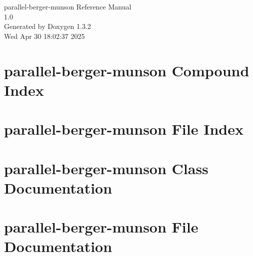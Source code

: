 \documentclass[a4paper]{book}
\begin{document}
\begin{titlepage}
\vspace*{7cm}
\begin{center}
{\Large parallel-berger-munson Reference Manual\\[1ex]\large 1.0 }\\
\vspace*{1cm}
{\large Generated by Doxygen 1.3.2}\\
\vspace*{0.5cm}
{\small Wed Apr 30 18:02:37 2025}\\
\end{center}
\end{titlepage}
\clearemptydoublepage
{}
\tableofcontents
\clearemptydoublepage
{}
\chapter{parallel-berger-munson Compound Index}

\chapter{parallel-berger-munson File Index}

\chapter{parallel-berger-munson Class Documentation}



\chapter{parallel-berger-munson File Documentation}



\printindex
\end{document}
